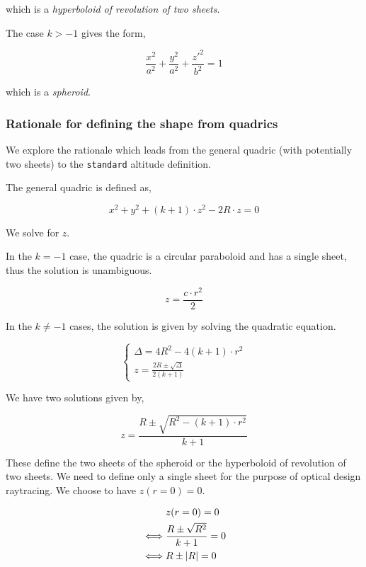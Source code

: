 which is a \emph{hyperboloid of revolution of two sheets}.

The case $k > -1$ gives the form,

\begin{equation}
\frac{x^2}{a^2} + \frac{y^2}{a^2} + \frac{z'^2}{b^2} = 1
\end{equation}

which is a \emph{spheroid}.

\subsubsection{Rationale for defining the shape from quadrics}
We explore the rationale which leads from the general quadric (with potentially
two sheets) to the \lstinline{standard} altitude definition.

The general quadric is defined as,

\begin{equation}
x^2 + y^2 + (k+1) \cdot z^2 - 2 R \cdot z = 0
\end{equation}

We solve for $z$.

In the $k=-1$ case, the quadric is a circular paraboloid and has a single
sheet, thus the solution is unambiguous.

\begin{equation}
z = \frac{c \cdot r^2}{2}
\end{equation}

In the $k\neq-1$ cases, the solution is given by solving the quadratic equation.

\begin{equation} \begin{cases}
\Delta = 4 R^2 - 4 (k+1) \cdot r^2 \\
z = \frac{2R \pm \sqrt{\Delta}}{2(k+1)}
\end{cases} \end{equation}

We have two solutions given by,

\begin{equation}
z = \frac{R \pm \sqrt{R^2 - (k+1) \cdot r^2}}{k + 1}
\end{equation}

These define the two sheets of the spheroid or the hyperboloid of revolution of
two sheets. We need to define only a single sheet for the purpose of optical
design raytracing. We choose to have $z(r=0) = 0$.

\begin{equation} \begin{split}
& z(r=0) = 0 \\
\iff & \frac{R \pm \sqrt{R^2}}{k+1} = 0 \\
\iff & R \pm \abs{R} = 0
\end{split} \end{equation}

